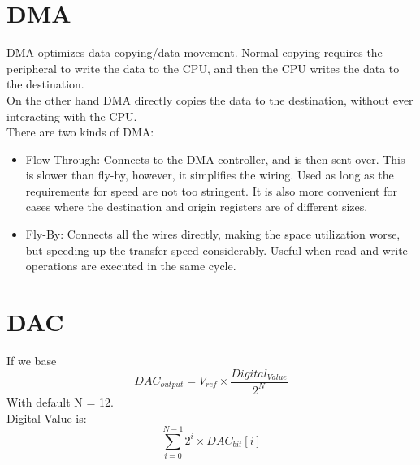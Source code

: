 \documentclass[nobib]{tufte-handout}
\begin{document}
\section{DMA}
DMA optimizes data copying/data movement. Normal copying requires the
peripheral to write the data to the CPU, and then the CPU writes the data to
the destination.\\ On the other hand DMA directly copies the data to the
destination, without ever interacting with the CPU.\\ There are two kinds of
DMA:\\
\begin{itemize}
    \item Flow-Through: Connects to the DMA controller, and is then sent over. This is
          slower than fly-by, however, it simplifies the wiring. Used as long as the
          requirements for speed are not too stringent. It is also more convenient for
          cases where the destination and origin registers are of different sizes.
    \item Fly-By: Connects all the wires directly, making the space utilization worse,
          but speeding up the transfer speed considerably. Useful when read and write
          operations are executed in the same cycle.
\end{itemize}
\section{DAC}
If we base
\begin{equation*}
    DAC_{output} = V_{ref} \times \frac{Digital_{Value}}{2^N}
\end{equation*}
With default N = 12.\\
Digital Value is:
\begin{equation*}
    \sum_{i=0}^{N-1}2^{i}\times DAC_{bit}[i]
\end{equation*}
\end{document}
